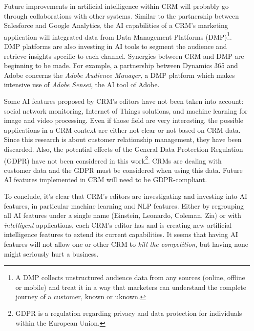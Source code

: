 Future improvements in artificial intelligence within CRM will probably go through collaborations with other systems. Similar to the partnership between Salesforce and Google Analytics, the AI capabilities of a CRM's marketing application will integrated data from Data Management Platforms (DMP)\footnote{A DMP collects unstructured audience data from any sources (online, offline or mobile) and treat it in a way that marketers can understand the complete journey of a customer, known or uknown.}. DMP platforms are also investing in AI tools to segment the audience and retrieve insights specific to each channel. Synergies between CRM and DMP are beginning to be made. For example, a partnership between Dynamics 365 and Adobe concerns the \textit{Adobe Audience Manager}, a DMP platform which makes intensive use of \textit{Adobe Sensei}, the AI tool of Adobe.

Some AI features proposed by CRM's editors have not been taken into account: social network monitoring, Internet of Things solutions, and machine learning for image and video processing. Even if those field are very interesting, the possible applications in a CRM context are either not clear or not based on CRM data. Since this research is about customer relationship management, they have been discarded. Also, the potential effects of the General Data Protection Regulation (GDPR) have not been considered in this work\footnote{GDPR is a regulation regarding privacy and data protection for individuals within the European Union.}.  CRMs are dealing with customer data and the GDPR must be considered when using this data. Future AI features implemented in CRM will need to be GDPR-compliant.

To conclude, it's clear that CRM's editors are investigating and investing into AI features, in particular machine learning and NLP features. Either by regrouping all AI features under a single name (Einstein, Leonardo, Coleman, Zia) or with \textit{intelligent} applications, each CRM's editor has and is creating new artificial intelligence features to extend its current capabilities. It seems that having AI features will not allow one or other CRM to \textit{kill the competition}, but having none might seriously hurt a business.